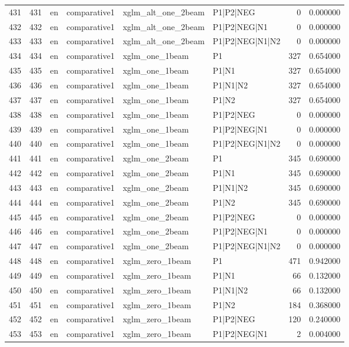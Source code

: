 \begin{tabular}{lrllllrr}
431 & 431 & en & comparative1 & xglm_alt_one_2beam & P1|P2|NEG & 0 & 0.000000 \\
432 & 432 & en & comparative1 & xglm_alt_one_2beam & P1|P2|NEG|N1 & 0 & 0.000000 \\
433 & 433 & en & comparative1 & xglm_alt_one_2beam & P1|P2|NEG|N1|N2 & 0 & 0.000000 \\
434 & 434 & en & comparative1 & xglm_one_1beam & P1 & 327 & 0.654000 \\
435 & 435 & en & comparative1 & xglm_one_1beam & P1|N1 & 327 & 0.654000 \\
436 & 436 & en & comparative1 & xglm_one_1beam & P1|N1|N2 & 327 & 0.654000 \\
437 & 437 & en & comparative1 & xglm_one_1beam & P1|N2 & 327 & 0.654000 \\
438 & 438 & en & comparative1 & xglm_one_1beam & P1|P2|NEG & 0 & 0.000000 \\
439 & 439 & en & comparative1 & xglm_one_1beam & P1|P2|NEG|N1 & 0 & 0.000000 \\
440 & 440 & en & comparative1 & xglm_one_1beam & P1|P2|NEG|N1|N2 & 0 & 0.000000 \\
441 & 441 & en & comparative1 & xglm_one_2beam & P1 & 345 & 0.690000 \\
442 & 442 & en & comparative1 & xglm_one_2beam & P1|N1 & 345 & 0.690000 \\
443 & 443 & en & comparative1 & xglm_one_2beam & P1|N1|N2 & 345 & 0.690000 \\
444 & 444 & en & comparative1 & xglm_one_2beam & P1|N2 & 345 & 0.690000 \\
445 & 445 & en & comparative1 & xglm_one_2beam & P1|P2|NEG & 0 & 0.000000 \\
446 & 446 & en & comparative1 & xglm_one_2beam & P1|P2|NEG|N1 & 0 & 0.000000 \\
447 & 447 & en & comparative1 & xglm_one_2beam & P1|P2|NEG|N1|N2 & 0 & 0.000000 \\
448 & 448 & en & comparative1 & xglm_zero_1beam & P1 & 471 & 0.942000 \\
449 & 449 & en & comparative1 & xglm_zero_1beam & P1|N1 & 66 & 0.132000 \\
450 & 450 & en & comparative1 & xglm_zero_1beam & P1|N1|N2 & 66 & 0.132000 \\
451 & 451 & en & comparative1 & xglm_zero_1beam & P1|N2 & 184 & 0.368000 \\
452 & 452 & en & comparative1 & xglm_zero_1beam & P1|P2|NEG & 120 & 0.240000 \\
453 & 453 & en & comparative1 & xglm_zero_1beam & P1|P2|NEG|N1 & 2 & 0.004000 \\

\end{tabular}
